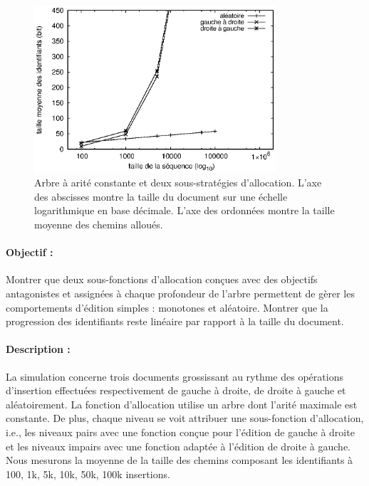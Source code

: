\begin{figure}
  \begin{center}
    \includegraphics[width=0.8\textwidth]{img/lseq/robin.eps}
    \caption[Influence de deux sous-fonctions d'allocations sur la taille des
    chemins] {\label{repl:img:suballocation} Arbre à arité constante et deux
      sous-stratégies d'allocation. L'axe des abscisses montre la taille du
      document sur une échelle logarithmique en base décimale. L'axe des
      ordonnées montre la taille moyenne des chemins alloués.}
  \end{center}
\end{figure}

\paragraph{Objectif :} Montrer que deux sous-fonctions d'allocation conçues avec
des objectifs antagonistes et assignées à chaque profondeur de l'arbre
permettent de gèrer les comportements d'édition simples : monotones et
aléatoire. Montrer que la progression des identifiants reste linéaire par
rapport à la taille du document.

\paragraph{Description :} La simulation concerne trois documents grossissant au
rythme des opérations d'insertion effectuées respectivement de gauche à droite,
de droite à gauche et aléatoirement. La fonction d'allocation utilise un arbre
dont l'arité maximale est constante. De plus, chaque niveau se voit attribuer
une sous-fonction d'allocation, i.e., les niveaux pairs avec une fonction conçue
pour l'édition de gauche à droite et les niveaux impairs avec une fonction
adaptée à l'édition de droite à gauche. Nous mesurons la moyenne de la taille
des chemins composant les identifiants à 100, 1k, 5k, 10k, 50k, 100k insertions.

